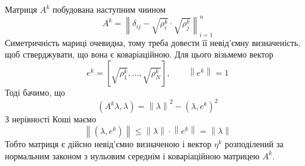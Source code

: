 Матриця $A^k$ побудована наступним чиином
\begin{equation*}
  A^k
  = \left\| \delta_{ij} - \sqrt{\rho_i^k} \cdot \sqrt{\rho_j^k} \right\|_{i=1}^n
\end{equation*}
Симетричність мариці очевидна, тому треба довести її невід’ємну визначеність,
щоб стверджувати, що вона є коваріаційною.
Для цього візьмемо вектор
\begin{equation*}
  e^k = \left[ \sqrt{\rho_1^k}, \dots, \sqrt{\rho_N^k} \right],\qquad
  \left\| e^k \right\| = 1
\end{equation*}
Тоді бачимо, що
\begin{equation}\label{eq:chi2:quadraticForm}
  \left( A^k \lambda, \lambda \right)
  = \left\| \lambda \right\|^2
    - \left( \lambda, e^k \right)^2
\end{equation}
З нерівності Коші маємо
\begin{equation*}
  \left\| \left( \lambda, e^k \right) \right\|
  \le \left\| \lambda \right\| \cdot \left\| e^k \right\|
  = \left\| \lambda \right\|
\end{equation*}
Тобто матриця є дійсно невід’ємно визначеною і вектор $\eta^k$ розподілений
за нормальним законом з нульовим середнім і коваріаційною матрицею $A^k$.

